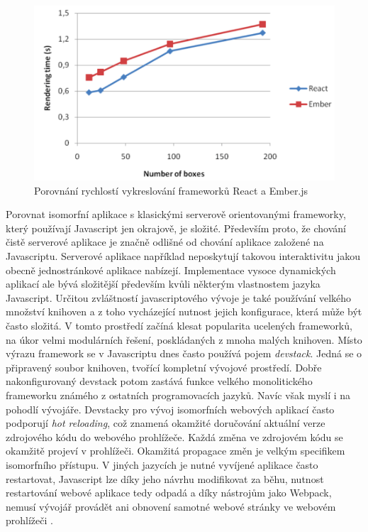 \begin{figure}[h]
\begin{centering}
\includegraphics[scale=0.4]{obrazky/comparison_1}
\par\end{centering}
\caption{Porovnání rychlostí vykreslování frameworků React a Ember.js \cite{mathiasson-isomorphic} \label{fig:comparison_2}}
\end{figure}
\FloatBarrier

Porovnat isomorfní aplikace s klasickými serverově orientovanými frameworky, který používají Javascript jen okrajově, je složité. Především proto, že chování čistě serverové aplikace je značně odlišné od chování aplikace založené na Javascriptu. Serverové aplikace například neposkytují takovou interaktivitu jakou obecně jednostránkové aplikace nabízejí. Implementace vysoce dynamických aplikací ale bývá složitější především kvůli některým vlastnostem jazyka Javascript. Určitou zvláštností javascriptového vývoje je také používání velkého množství knihoven a z toho vycházející nutnost jejich konfigurace, která může být často složitá. V tomto prostředí začíná klesat popularita ucelených frameworků, na úkor velmi modulárních řešení, poskládaných z mnoha malých knihoven. Místo výrazu framework se v Javascriptu dnes často používá pojem \textit{devstack}. Jedná se o připravený soubor knihoven, tvořící kompletní vývojové prostředí. Dobře nakonfigurovaný devstack potom zastává funkce velkého monolitického frameworku známého z ostatních programovacích jazyků. Navíc však myslí i na pohodlí vývojáře. Devstacky pro vývoj isomorfních webových aplikací často podporují \textit{hot reloading}, což znamená okamžité doručování aktuální verze zdrojového kódu do webového prohlížeče. Každá změna ve zdrojovém kódu se okamžitě projeví v prohlížeči. Okamžitá propagace změn je velkým specifikem isomorfního přístupu. V jiných jazycích je nutné vyvíjené aplikace často restartovat, Javascript lze díky jeho návrhu modifikovat za běhu, nutnost restartování webové aplikace tedy odpadá a díky nástrojům jako Webpack, nemusí vývojář provádět ani obnovení samotné webové stránky ve webovém prohlížeči \cite{webpack}.

